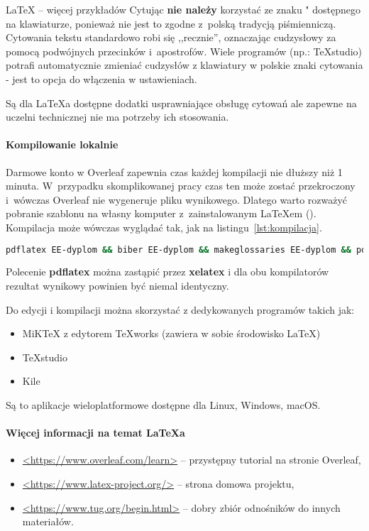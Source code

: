 \begin{easyappendix}{\LaTeX{} -- więcej przykładów}
Cytując \textbf{nie należy} korzystać ze znaku " dostępnego na klawiaturze, ponieważ nie jest to zgodne z~polską tradycją piśmienniczą. Cytowania tekstu standardowo robi się ,,recznie'', oznaczając cudzysłowy za pomocą podwójnych przecinków i~apostrofów. Wiele programów (np.: TeXstudio) potrafi automatycznie zmieniać cudzysłów z klawiatury w polskie znaki cytowania - jest to opcja do włączenia w ustawieniach.

Są dla \LaTeX{a} dostępne dodatki usprawniające obsługę cytowań ale zapewne na uczelni technicznej nie ma potrzeby ich stosowania.

\paragraph{Kompilowanie lokalnie}
Darmowe konto w Overleaf zapewnia czas każdej kompilacji nie dłuższy niż 1 minuta. W~przypadku skomplikowanej pracy czas ten może zostać przekroczony i~wówczas Overleaf nie wygeneruje pliku wynikowego. Dlatego warto rozważyć pobranie szablonu na własny komputer z~zainstalowanym \LaTeX{em} (). Kompilacja może wówczas wyglądać tak, jak na listingu~\ref{lst:kompilacja}.

\begin{lstlisting}[language=bash,
	caption={Kompilacja pracy dyplomowej lokalnie},
	label={lst:kompilacja}]
	pdflatex EE-dyplom && biber EE-dyplom && makeglossaries EE-dyplom && pdflatex EE-dyplom && pdflatex EE-dyplom
\end{lstlisting}

Polecenie \textbf{pdflatex} można zastąpić przez \textbf{xelatex} i dla obu kompilatorów rezultat wynikowy powinien być niemal identyczny.

Do edycji i kompilacji można skorzystać z dedykowanych programów takich jak:
\begin{itemize}
	\item MiKTeX z edytorem TeXworks (zawiera w sobie środowisko \LaTeX)
	\item TeXstudio
	\item Kile
\end{itemize}

Są to aplikacje wieloplatformowe dostępne dla Linux, Windows, macOS.


\paragraph{Więcej informacji na temat \LaTeX{a}}
\begin{itemize}
	\item \href{https://www.overleaf.com/learn}{<https://www.overleaf.com/learn>} -- przystępny tutorial na stronie Overleaf,
	\item \href{https://www.latex-project.org/}{<https://www.latex-project.org/>} -- strona domowa projektu,
	\item \href{https://www.tug.org/begin.html}{<https://www.tug.org/begin.html>} -- dobry zbiór odnośników do innych materiałów.
\end{itemize}


\end{easyappendix}

